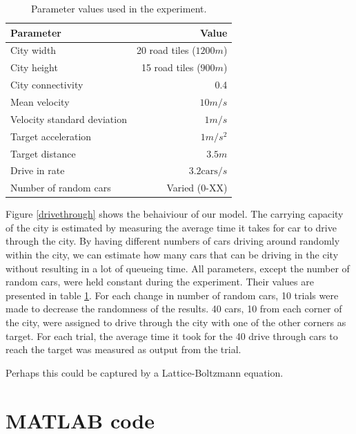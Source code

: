 \documentclass[11pt,a4paper]{article}
\begin{document}
\begin{table}[htb]
  \caption{Parameter values used in the experiment.}
  \label{params}
  \begin{center}
  \begin{tabular}{l | r}
  Parameter & Value \\
  \hline
  City width & 20 road tiles ($1200 m$) \\
  City height & 15 road tiles ($900 m$) \\
  City connectivity & 0.4 \\
  Mean velocity & $10 m/s$ \\
  Velocity standard deviation & $1 m/s$ \\
  Target acceleration &$ 1 m/s^2$\\
  Target distance & $3.5 m$\\
  Drive in rate & $3.2 \text{cars}/s$ \\
  Number of random cars & Varied (0-XX) \\
  \end{tabular}
  \end{center}
\end{table}

Figure \ref{drivethrough} shows the behaiviour of our model. The carrying
capacity of the city is estimated by measuring the average time it takes for car
to drive through the city. By having different numbers of cars driving around
randomly within the city, we can estimate how many cars that can be driving in
the city without resulting in a lot of queueing time. All parameters, except the
number of random cars, were held constant during the experiment. Their values
are presented in table \ref{params}. For each change
in number of random cars, 10 trials were made to decrease the randomness of
the results. 40 cars, 10 from each corner of the city, were assigned to drive
through the city with one of the other corners as target. For each trial, the
average time it took for the 40 drive through cars to reach the target was
measured as output from the trial.

Perhaps this could be captured by a Lattice-Boltzmann equation.

\section{MATLAB code}
\end{document}
